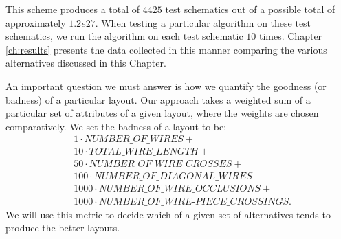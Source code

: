 This scheme produces a total of $4425$ test schematics out of a possible total
of approximately $1.2e27$. When testing a particular algorithm on these test
schematics, we run the algorithm on each test schematic $10$ times. Chapter
\ref{ch:results} presents the data collected in this manner comparing the
various alternatives discussed in this Chapter.

An important question we must answer is how we quantify the goodness (or badness)
of a particular layout. Our approach takes a weighted sum of a particular set of
attributes of a given layout, where the weights are chosen comparatively. We set
the badness of a layout to be:
\begin{align*}
&1 \cdot NUMBER\_OF\_WIRES + \\
&10 \cdot TOTAL\_WIRE\_LENGTH + \\
&50 \cdot NUMBER\_OF\_WIRE\_CROSSES + \\
&100 \cdot NUMBER\_OF\_DIAGONAL\_WIRES + \\
&1000 \cdot NUMBER\_OF\_WIRE\_OCCLUSIONS + \\
&1000 \cdot NUMBER\_OF\_WIRE\text{-}PIECE\_CROSSINGS.
\end{align*}
We will use this metric to decide which of a given set of alternatives tends to
produce the better layouts.
